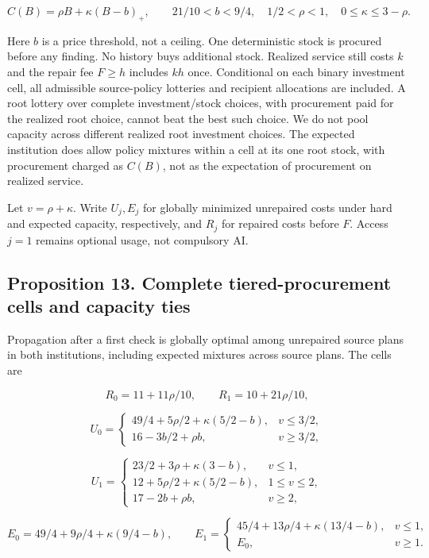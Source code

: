\documentclass[
  11pt,
  a4paper,
]{article}
\begin{document}
\[C(B)=\rho B+\kappa(B-b)_+,\qquad
21/10<b<9/4,\quad 1/2<\rho<1,\quad0\leq\kappa\leq3-\rho.\tag{66}\]

Here \(b\) is a price threshold, not a ceiling. One deterministic stock
is procured before any finding. No history buys additional stock.
Realized service still costs \(k\) and the repair fee \(F\geq h\)
includes \(kh\) once. Conditional on each binary investment cell, all
admissible source-policy lotteries and recipient allocations are
included. A root lottery over complete investment/stock choices, with
procurement paid for the realized root choice, cannot beat the best such
choice. We do not pool capacity across different realized root
investment choices. The expected institution does allow policy mixtures
within a cell at its one root stock, with procurement charged as
\(C(B)\), not as the expectation of procurement on realized service.

Let \(v=\rho+\kappa\). Write \(U_j,E_j\) for globally minimized
unrepaired costs under hard and expected capacity, respectively, and
\(R_j\) for repaired costs before \(F\). Access \(j=1\) remains optional
usage, not compulsory AI.

\hypertarget{proposition-13.-complete-tiered-procurement-cells-and-capacity-ties}{%
\subsection{Proposition 13. Complete tiered-procurement cells and
capacity
ties}\label{proposition-13.-complete-tiered-procurement-cells-and-capacity-ties}}

Propagation after a first check is globally optimal among unrepaired
source plans in both institutions, including expected mixtures across
source plans. The cells are

\[R_0=11+11\rho/10,\qquad R_1=10+21\rho/10,\tag{67}\]

\[U_0=\begin{cases}49/4+5\rho/2+\kappa(5/2-b),&v\leq3/2,\\16-3b/2+\rho b,&v\geq3/2,\end{cases}\tag{68}\]

\[U_1=\begin{cases}23/2+3\rho+\kappa(3-b),&v\leq1,\\12+5\rho/2+\kappa(5/2-b),&1\leq v\leq2,\\17-2b+\rho b,&v\geq2,\end{cases}\tag{69}\]

\[E_0=49/4+9\rho/4+\kappa(9/4-b),\qquad
E_1=\begin{cases}45/4+13\rho/4+\kappa(13/4-b),&v\leq1,\\E_0,&v\geq1.\end{cases}\tag{70}\]
\end{document}
